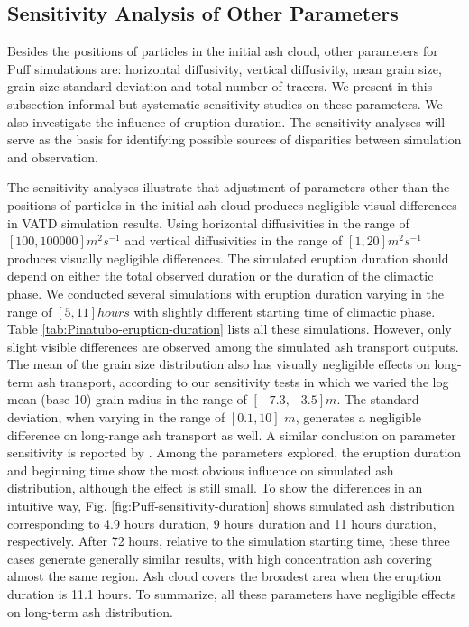 \documentclass[utf8]{frontiersSCNS} %
\begin{document}
\subsection{Sensitivity Analysis of Other Parameters}

Besides the positions of particles in the initial ash cloud, other parameters for Puff simulations are: horizontal diffusivity, vertical diffusivity, mean grain size, grain size standard deviation and total number of tracers. We present in this subsection informal but systematic sensitivity studies on these parameters. We also investigate the influence of eruption duration. The sensitivity analyses will serve as the basis for identifying possible sources of disparities between simulation and observation.

The sensitivity analyses illustrate that adjustment of parameters other than the positions of particles in the initial ash cloud produces negligible visual differences in VATD simulation results. Using horizontal diffusivities in the range of $[100, 100000] m^2s^{-1} $ and vertical diffusivities in the range of $[1, 20] m^2s^{-1}$ produces visually negligible differences. The simulated eruption duration should depend on either the total observed duration or the duration of the climactic phase. We conducted several simulations with eruption duration varying in the range of $[5, 11] hours$ with slightly different starting time of climactic phase. Table \ref{tab:Pinatubo-eruption-duration} lists all these simulations. However, only slight visible differences are observed among the simulated ash transport outputs. The mean of the grain size distribution also has visually negligible effects on long-term ash transport, according to our sensitivity tests in which we varied the log mean (base 10) grain radius in the range of $[-7.3, -3.5] m$. The standard deviation, when varying in the range of $[0.1, 10]$ $m$, generates a negligible difference on long-range ash transport as well. A similar conclusion on parameter sensitivity is reported by \citet[e.g.][]{fero2008simulation, daniele2009applications}. Among the parameters explored, the eruption duration and beginning time show the most obvious influence on simulated ash distribution, although the effect is still small. To show the differences in an intuitive way, 
Fig. \ref{fig:Puff-sensitivity-duration} shows simulated ash distribution corresponding to 4.9 hours duration, 9 hours duration and 11 hours duration, respectively. After 72 hours, relative to the simulation starting time, these three cases generate generally similar results, with high concentration ash covering almost the same region. Ash cloud covers the broadest area when the eruption duration is 11.1 hours. To summarize, all these parameters have negligible effects on long-term ash distribution.
\end{document}
